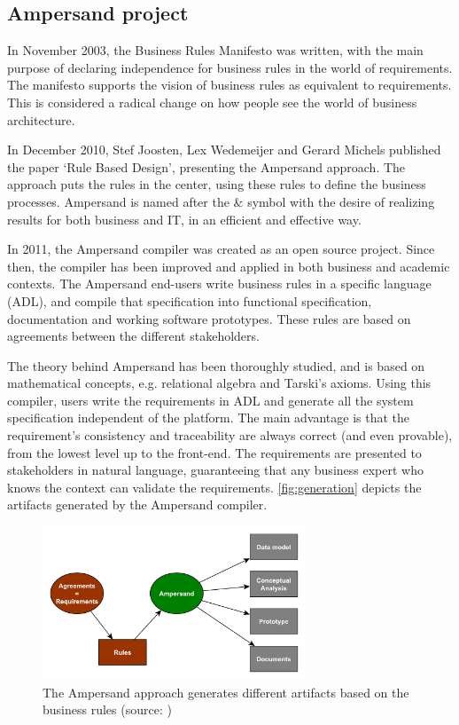 
\subsection{Ampersand project}
In November 2003, the Business Rules Manifesto  was written, with the main purpose of declaring independence for business rules in the world of requirements.
The manifesto supports the vision of business rules as equivalent to requirements.
This is considered a radical change on how people see the world of business architecture.

In December 2010, Stef Joosten, Lex Wedemeijer and Gerard Michels published the paper `Rule Based Design', presenting the Ampersand approach.
The approach puts the rules in the center, using these rules to define the business processes.
Ampersand is named after the \& symbol with the desire of realizing results for both business and IT, in an efficient and effective way.

In 2011, the Ampersand compiler was created as an open source project.
Since then, the compiler has been improved and applied in both business and academic contexts.
The Ampersand end-users write business rules in a specific language (ADL), and compile that specification into functional specification, documentation and working software prototypes.
%
These rules are based on agreements between the different stakeholders.

The theory behind Ampersand has been thoroughly studied, and is based on mathe\-matical concepts, e.g. relational algebra and Tarski's axioms.
Using this compiler, users write the requirements in ADL and generate all the system specification independent of the platform.
The main advantage is that the requirement's consistency and traceability are always correct (and even provable), from the lowest level up to the front-end.
The requirements are presented to stakeholders in natural language, guaranteeing that any business expert who knows the context can validate the requirements.
\autoref{fig:generation} depicts the artifacts generated by the Ampersand compiler.
%
\begin{figure}[htb]
	\centering
	\includegraphics[width=0.7\textwidth]{Figures/Generation}
	\caption[Generated artifacts]{The Ampersand approach generates different artifacts based on the business rules (source: \cite{ampersand-approach})}
	\label{fig:generation}
\end{figure}
%

